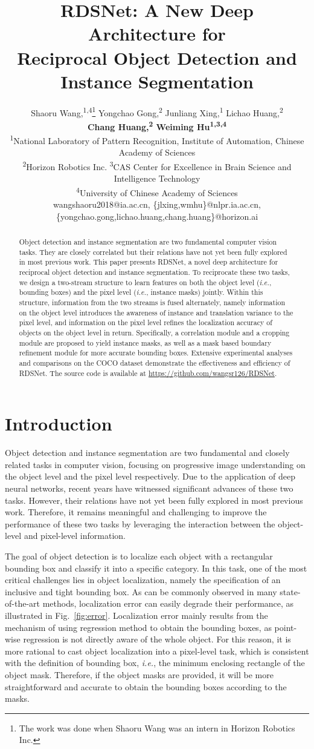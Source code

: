 \documentclass[letterpaper]{article} \usepackage{aaai20}  \usepackage{times}  \usepackage{helvet} \usepackage{courier}  \usepackage[hyphens]{url}  \usepackage{graphicx} \urlstyle{rm} \def\UrlFont{\rm}  \usepackage{graphicx}  \frenchspacing  \setlength{\pdfpagewidth}{8.5in}  \setlength{\pdfpageheight}{11in}
\title{RDSNet: A New Deep Architecture for\\Reciprocal Object Detection and Instance Segmentation}
\author{Shaoru Wang,\textsuperscript{\rm 1,4}\thanks{The work was done when Shaoru Wang was an intern in Horizon Robotics Inc.} Yongchao Gong,\textsuperscript{\rm 2} Junliang Xing,\textsuperscript{\rm 1} Lichao Huang,\textsuperscript{\rm 2} \\ 
\Large \textbf{Chang Huang,\textsuperscript{\rm 2} Weiming Hu\textsuperscript{\rm 1,3,4}} \\
\textsuperscript{\rm 1}National Laboratory of Pattern Recognition, Institute of Automation, Chinese Academy of Sciences\\ 
\textsuperscript{\rm 2}Horizon Robotics Inc.
\textsuperscript{\rm 3}CAS Center for Excellence in Brain Science and Intelligence Technology\\
\textsuperscript{\rm 4}University of Chinese Academy of Sciences\\
wangshaoru2018@ia.ac.cn, \{jlxing,wmhu\}@nlpr.ia.ac.cn, \{yongchao.gong,lichao.huang,chang.huang\}@horizon.ai
}
\newcommand{\ie}{\textit{i.e.}}
\begin{document}
\maketitle
\begin{abstract}
Object detection and instance segmentation are two fundamental computer vision tasks. They are closely correlated but their relations have not yet been fully explored in most previous work. This paper presents RDSNet, a novel deep architecture for reciprocal object detection and instance segmentation. To reciprocate these two tasks, we design a two-stream structure to learn features on both the object level (\ie, bounding boxes) and the pixel level (\ie, instance masks) jointly. Within this structure, information from the two streams is fused alternately, namely information on the object level introduces the awareness of instance and translation variance to the pixel level, and information on the pixel level refines the localization accuracy of objects on the object level in return. Specifically, a correlation module and a cropping module are proposed to yield instance masks, as well as a mask based boundary refinement module for more accurate bounding boxes. Extensive experimental analyses and comparisons on the COCO dataset demonstrate the effectiveness and efficiency of RDSNet. The source code is available at \url{https://github.com/wangsr126/RDSNet}.
\end{abstract}

\section{Introduction}
Object detection and instance segmentation are two fundamental and closely related tasks in computer vision, focusing on progressive image understanding on the object level and the pixel level respectively. Due to the application of deep neural networks, recent years have witnessed significant advances of these two tasks. However, their relations have not yet been fully explored in most previous work. Therefore, it remains meaningful and challenging to improve the performance of these two tasks by leveraging the interaction between the object-level and pixel-level information.

The goal of object detection is to localize each object with a rectangular bounding box and classify it into a specific category. In this task, one of the most critical challenges lies in object localization, namely the specification of an inclusive and tight bounding box. As can be commonly observed in many state-of-the-art methods, localization error can easily degrade their performance, as illustrated in Fig.~\ref{fig:error}. Localization error mainly results from the mechanism of using regression method to obtain the bounding boxes, as point-wise regression is not directly aware of the whole object. For this reason, it is more rational to cast object localization into a pixel-level task, which is consistent with the definition of bounding box, \ie, the minimum enclosing rectangle of the object mask. Therefore, if the object masks are provided, it will be more straightforward and accurate to obtain the bounding boxes according to the masks.
\end{document}
